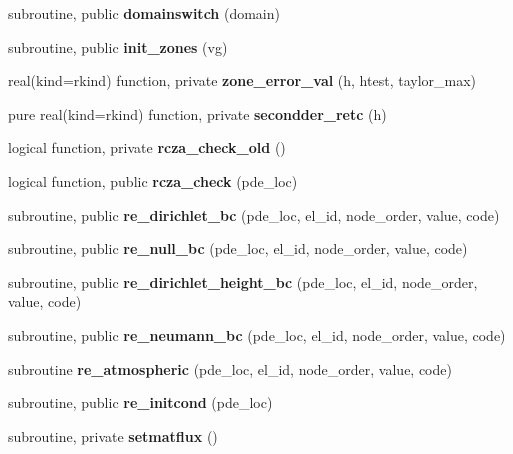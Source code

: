 \begin{DoxyCompactItemize}
subroutine, public {\bf domainswitch} (domain)
\item 
subroutine, public {\bf init\+\_\+zones} (vg)
\item 
real(kind=rkind) function, private {\bf zone\+\_\+error\+\_\+val} (h, htest, taylor\+\_\+max)
\item 
pure real(kind=rkind) function, private {\bf secondder\+\_\+retc} (h)
\item 
logical function, private {\bf rcza\+\_\+check\+\_\+old} ()
\item 
logical function, public {\bf rcza\+\_\+check} (pde\+\_\+loc)
\item 
subroutine, public {\bf re\+\_\+dirichlet\+\_\+bc} (pde\+\_\+loc, el\+\_\+id, node\+\_\+order, value, code)
\item 
subroutine, public {\bf re\+\_\+null\+\_\+bc} (pde\+\_\+loc, el\+\_\+id, node\+\_\+order, value, code)
\item 
subroutine, public {\bf re\+\_\+dirichlet\+\_\+height\+\_\+bc} (pde\+\_\+loc, el\+\_\+id, node\+\_\+order, value, code)
\item 
subroutine, public {\bf re\+\_\+neumann\+\_\+bc} (pde\+\_\+loc, el\+\_\+id, node\+\_\+order, value, code)
\item 
subroutine {\bf re\+\_\+atmospheric} (pde\+\_\+loc, el\+\_\+id, node\+\_\+order, value, code)
\item 
subroutine, public {\bf re\+\_\+initcond} (pde\+\_\+loc)
\item 
subroutine, private {\bf setmatflux} ()
\end{DoxyCompactItemize}
